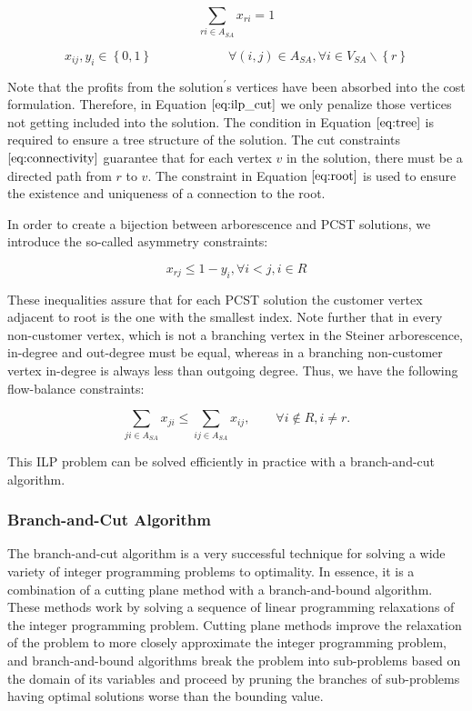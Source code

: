\documentclass{SMBV12}
\begin{document}
\begin{equation}
\sum\limits_{ri \in A_{SA}} x_{ri} = 1
\label{eq:root}
\end{equation}

\begin{equation}
x_{ij}, y_i \in \left\lbrace 0, 1 \right\rbrace \qquad \qquad \qquad \forall (i, j) \in A_{SA}, \forall i \in V_{SA} \backslash \left\lbrace r \right\rbrace 
\end{equation}

Note that the profits from the solution$^{\prime}$s vertices have been absorbed into the cost formulation. Therefore, in Equation $\ref{eq:ilp_cut}$ we only penalize those vertices not getting included into the solution. The condition in Equation $\ref{eq:tree}$ is required to ensure a tree structure of the solution. The cut constraints $\ref{eq:connectivity}$ guarantee that for each vertex $v$ in the solution, there must be a directed path from $r$ to $v$. The constraint in Equation $\ref{eq:root}$ is used to ensure the existence and uniqueness of a connection to the root.

In order to create a bijection between arborescence and PCST solutions, we introduce the so-called asymmetry
constraints:

\begin{equation}
x_{rj} \leq 1 - y_i, \forall i < j, i \in R
\end{equation}

These inequalities assure that for each PCST solution the customer vertex adjacent to root is the one with the
smallest index. Note further that in every non-customer vertex, which is not a branching vertex in the Steiner arborescence, in-degree and out-degree must be equal, whereas in a branching non-customer vertex in-degree is always less than outgoing degree. Thus, we have the following flow-balance constraints:

\begin{equation}
\sum\limits_{ji \in A_{SA}} x_{ji} \leq \sum\limits_{ij \in A_{SA}} x_{ij}, \qquad \forall i \notin R, i \neq r.
\end{equation}

This ILP problem can be solved efficiently in practice with a branch-and-cut algorithm.

\subsubsection{Branch-and-Cut Algorithm}

The branch-and-cut algorithm is a very successful technique for solving a wide variety of integer programming problems to optimality. In essence, it is a combination of a cutting plane method with a branch-and-bound algorithm. These methods work by solving a sequence of linear programming relaxations of the integer programming
problem. Cutting plane methods improve the relaxation of the problem to more closely approximate the integer programming problem, and branch-and-bound algorithms break the problem into sub-problems based on the domain of its variables and proceed by pruning the branches of sub-problems having optimal solutions worse than the bounding value.
\end{document}
